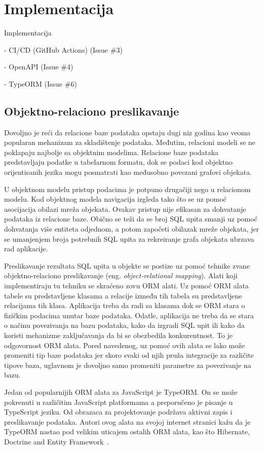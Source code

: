 \chapter{Implementacija}\label{ch:impl}

Implementacija

- CI/CD (GitHub Actions) (Issue \#3)

- OpenAPI (Issue \#4)

- TypeORM (Issue \#6)
\section{Objektno-relaciono preslikavanje}\label{sec:objektno-relaciono-preslikavanje}

Dovoljno je reći da relacione baze podataka opstaju dugi niz godina kao veoma popularan mehanizam za skladištenje
podataka. Međutim, relacioni modeli se ne poklapaju najbolje sa objektnim modelima. Relacione baze podataka
predstavljaju podatke u tabelarnom formatu, dok se podaci kod objektno orijentisanih jezika mogu posmatrati kao
međusobno povezani grafovi objekata.

U objektnom modelu pristup podacima je potpuno drugačiji nego u relacionom modelu. Kod objektnog modela navigacija
izgleda tako što se uz pomoć asocijacija obilazi mreža objekata. Ovakav pristup nije efikasan za dohvatanje podataka iz
relacione baze. Obično se teži da se broj SQL upita smanji uz pomoć dohvatanja više entiteta odjednom, a potom započeti
obilazak mreže objekata, jer se umanjenjem broja potrebnih SQL upita za rekreiranje grafa objekata ubrzava rad
aplikacije.

Preslikavanje rezultata SQL upita u objekte se postize uz pomoć tehnike zvane objektno-relaciono preslikavanje
(eng. \textit{object-relational mapping}). Alati koji implementiraju tu tehniku se skraćeno zovu ORM alati. Uz pomoć ORM alata
tabele su predstavljene klasama a relacije između tih tabela su predstavljene relacijama tih klasa. Aplikacija treba da
radi sa klasama dok se ORM stara o fizičkim podacima unutar baze podataka. Odatle, aplikacija ne treba da se stara o
načinu povezivanja na bazu podataka, kako da izgradi SQL upit ili kako da koristi mehanizme zaključavanja da bi se
obezbedila konkurentnost. To je odgovornost ORM alata. Pored navedenog, uz pomoć ovih alata se lako može promeniti tip
baze podataka jer skoro svaki od njih pruža integracije za različite tipove baza, uglavnom je dovoljno samo promeniti
parametre za povezivanje na bazu.

Jedan od popularnijih ORM alata za JavaScript je TypeORM. On se može pokrenuti u različitim JavaScript platformama a
preporučeno je pisanje u TypeScript jeziku. Od obrazaca za projektovanje podržava aktivni zapis i preslikavanje podataka.
Autori ovog alata na svojoj internet stranici kažu da je TypeORM nastao pod velikim uticajem ostalih ORM alata, kao što
Hibernate, Doctrine and Entity Framework~\cite{TypeORM}.

